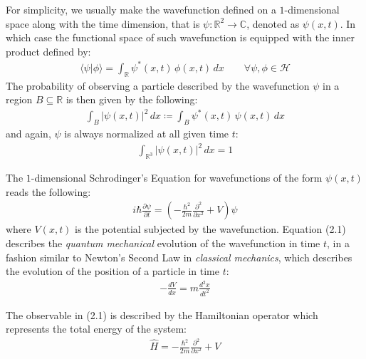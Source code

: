 \documentclass[11pt]{book}
\theoremstyle{break}
\theoremstyle{break}
\newcommand{\R}{\mathbb{R}}
\newcommand{\C}{\mathbb{C}}
\newcommand{\pd}{\partial}
\begin{document}
For simplicity, we usually make the wavefunction defined on a $1$-dimensional space along with the time dimension, that is $\psi:\R^2 \to \C$, denoted as $\psi(x,t)$. In which case the functional space of such wavefunction is equipped with the inner product defined by:
\begin{align*}
\langle \psi | \phi\rangle = \int_{\R} \psi^*(x,t)\, \phi(x,t) \, dx\qquad \forall	 \psi, \phi \in \mathcal{H}
\end{align*}
The probability of observing a particle described by the wavefunction $\psi$ in a region $B \subseteq \R$ is then given by the following:
\begin{align*}
\int_B |\psi(x,t) |^2 \, dx \coloneqq \int_B \psi^*(x,t) \,\psi(x,t) \, dx
\end{align*}
and again, $\psi$ is always normalized at all given time $t$:
\begin{align*}
\int_{\R^3} |\psi(x,t)|^2 \, dx= 1
\end{align*}



The $1$-dimensional Schrodinger's Equation for wavefunctions of the form $\psi(x,t)$ reads the following:
\begin{align}
i\hbar \frac{\pd \psi}{\pd t} = \left( - \frac{\hbar^2}{2m}\frac{\pd^2}{\pd x^2}+V \right) \psi
\end{align}
where $V(x,t)$ is the potential subjected by the wavefunction. Equation (2.1) describes the \textit{quantum mechanical} evolution of the wavefunction in time $t$, in a fashion similar to Newton's Second Law in \textit{classical mechanics}, which describes the evolution of the position of a particle in time $t$:
\begin{align*}
-\frac{dV}{dx} = m\frac{d^2 x}{d t^2} 
\end{align*}

The observable in (2.1) is described by the Hamiltonian operator which represents the total energy of the system:
\begin{align*}
\hat{H} = -\frac{\hbar^2}{2m}\frac{\pd^2}{\pd x^2} + V
\end{align*}
\newpage
\end{document}
